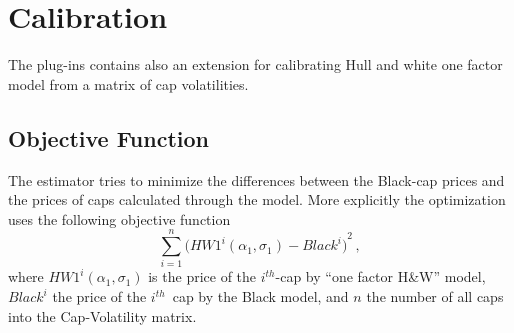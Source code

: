 \section{Calibration}
The plug-ins contains also an extension for calibrating Hull and white one factor model from a matrix of cap volatilities.
\subsection{Objective Function}
The estimator tries to minimize the differences between the Black-cap prices and the prices of caps calculated through the model. More explicitly the optimization uses the following objective function
\begin{equation}
\displaystyle\sum_{i=1}^n {\Big( {HW1^i(\alpha_1,\sigma_1)} - {Black}^i \Big)}^2  \, ,
\end{equation}
where ${HW1^i(\alpha_1,\sigma_1)}$ is the price of the $i^{th}$-cap by ``one factor H\&W'' model, ${Black}^i$ the price of the $i^{th}$~cap by the Black model, and $n$ the number of all caps into the Cap-Volatility matrix.
